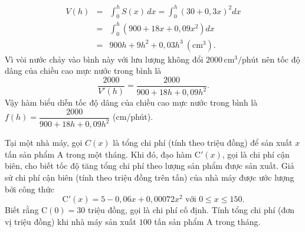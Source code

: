 \begin{bt}
{\begin{eqnarray*}
		V(h) &=& \displaystyle\int_0^h S(x)\, dx = \int_0^h \left(30 + 0{,}3x\right)^2 dx\\
		&=& \displaystyle\int_0^h \left(900 + 18x + 0{,}09x^2\right) dx \\
		&=& 900h + 9h^2 + 0{,}03h^3~\left(\text{cm$^3$} \right).
	\end{eqnarray*}
	Vì vòi nước chảy vào bình này với lưu lượng không đổi $2000\,\text{cm$^3$/phút}$ nên tốc độ dâng của chiều cao mực nước trong bình là
	\[\dfrac{2000}{V'(h)}=\dfrac{2000}{900 + 18h + 0{,}09h^2}.\]
	}
	Vậy hàm biểu diễn tốc độ dâng của chiều cao mực nước trong bình là $f(h)=\dfrac{2000}{900 + 18h + 0{,}09h^2}$ (cm/phút).
\end{bt}

\begin{bt}%
	Tại một nhà máy, gọi $C(x)$ là tổng chi phí (tính theo triệu đồng) để sản xuất $x$ tấn sản phẩm $\mathrm{A}$ trong một tháng. Khi đó, đạo hàm $\mathrm{C}'(x)$, gọi là chi phí cận biên, cho biết tốc độ tăng tổng chi phí theo lượng sản phẩm được sản xuất. Giả sử chi phí cận biên (tính theo triệu đồng trên tấn) của nhà máy được ước lượng bởi công thức
	$$
	\mathrm{C}'(x)=5-0{,}06 x+0{,}00072 x^2 \text{ với } 0 \leq x \leq 150.
	$$
	Biết rằng $\mathrm{C}(0)=30$ triệu đồng, gọi là chi phí cố định. Tính tổng chi phí (đơn vị triệu đồng) khi nhà máy sản xuất $100$ tấn sản phẩm A trong tháng.
\end{bt}

